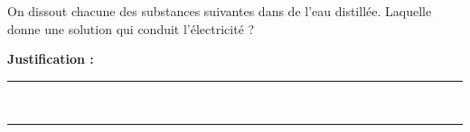 On dissout chacune des substances suivantes dans de l'eau distillée. Laquelle donne une solution qui conduit l'électricité ?

\choices

\noindent\textbf{Justification :} \hrulefill \\[2.5ex]
\rule{\linewidth}{0.4pt} \\[2.5ex]
\rule{\linewidth}{0.4pt}
\vfill
